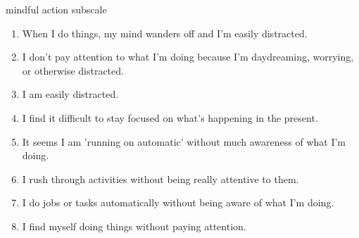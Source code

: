 \documentclass[aspectratio=169]{beamer}
\theoremstyle{remark}
\begin{document}
\begin{frame}{mindful action subscale}

    \begin{enumerate}
        \item When I do things, my mind wanders off and I'm easily distracted.
        \item I don't pay attention to what I'm doing because I'm daydreaming, worrying, or otherwise distracted.
        \item I am easily distracted.
        \item I find it difficult to stay focused on what's happening in the present.
        \item It seems I am 'running on automatic' without much awareness of what I'm doing.
        \item I rush through activities without being really attentive to them.
        \item I do jobs or tasks automatically without being aware of what I'm doing.
        \item I find myself doing things without paying attention.
    \end{enumerate}

\end{frame}
\end{document}
